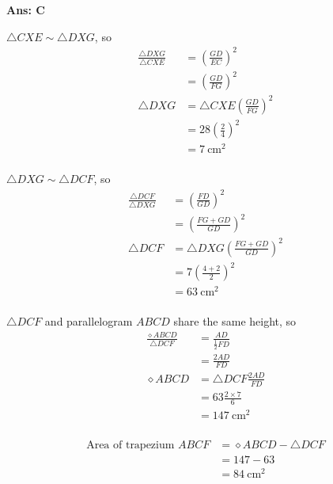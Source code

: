 \documentclass[border=3pt,varwidth=70mm]{standalone}
\begin{document}
\begin{answer}
\hrulefill\par
\textbf{Ans: C}

$\bigtriangleup CXE\sim \bigtriangleup DXG$, so
\begin{equation*}
\begin{aligned}
\frac{\bigtriangleup DXG}{\bigtriangleup CXE} &= \left(\frac{GD}{EC}\right)^2 \\
											&= \left(\frac{GD}{FG}\right)^2 \\
\bigtriangleup DXG &= \bigtriangleup CXE \left(\frac{GD}{FG}\right)^2 \\
					&= 28\left(\frac{2}{4}\right)^2 \\
					&= \SI{7}{\centi\meter\squared} \\
\end{aligned}
\end{equation*}

$\bigtriangleup DXG\sim \bigtriangleup DCF$, so
\begin{equation*}
\begin{aligned}
\frac{\bigtriangleup DCF}{\bigtriangleup DXG} &= \left(\frac{FD}{GD}\right)^2 \\
											&= \left(\frac{FG+GD}{GD}\right)^2 \\
\bigtriangleup DCF &= \bigtriangleup DXG \left(\frac{FG+GD}{GD}\right)^2 \\
					&= 7\left(\frac{4+2}{2}\right)^2 \\
					&= \SI{63}{\centi\meter\squared} \\
\end{aligned}
\end{equation*}

$\bigtriangleup DCF$ and parallelogram $ABCD$ share the same height, so
\begin{equation*}
\begin{aligned}
\frac{\diamond ABCD}{\bigtriangleup DCF} &= \frac{AD}{\frac{1}{2}FD} \\
											&= \frac{2AD}{FD} \\
\diamond ABCD &= \bigtriangleup DCF\frac{2AD}{FD} \\
			  &= 63\frac{2\times 7}{6} \\
			  &= \SI{147}{\centi\meter\squared} \\
\end{aligned}
\end{equation*}

\begin{equation*}
\begin{aligned}
\text{Area of trapezium } ABCF &= \diamond ABCD - \bigtriangleup DCF \\
						&= 147 - 63 \\
						&= \SI{84}{\centi\meter\squared} \\  
\end{aligned}
\end{equation*}

\end{answer}
\end{document}
